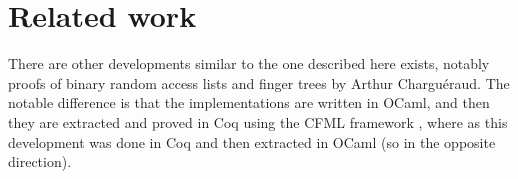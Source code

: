 \documentclass{article}
\begin{document}
\section{Related work}

There are other developments similar to the one described here exists, notably proofs of binary random access lists \cite{cfml_binary_random_access_lists} and finger trees \cite{cfml_finger_trees} by Arthur Charguéraud. The notable difference is that the implementations are written in OCaml, and then they are extracted and proved in Coq using the CFML framework \cite{cfml}, where as this development was done in Coq and then extracted in OCaml (so in the opposite direction).

\printbibliography
\end{document}
